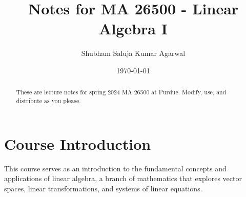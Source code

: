 \documentclass[nobib]{tufte-handout}
\title{Notes for MA 26500 - Linear Algebra I}
\author[Shubham Saluja Kumar Agarwal]{Shubham Saluja Kumar Agarwal}
\date{\today}  %
\begin{document}
\maketitle

\begin{abstract}
These are lecture notes for spring 2024 MA 26500 at Purdue. Modify, use, and distribute as you please.
\end{abstract}

\tableofcontents

\section{Course Introduction}
This course serves as an introduction to the fundamental concepts and applications of linear algebra, a branch of mathematics that explores vector spaces, linear transformations, and systems of linear equations.

\pagebreak 
\end{document}
